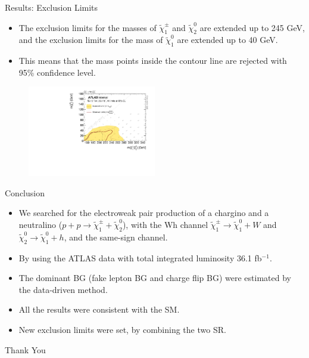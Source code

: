 \documentclass[mathserif,serif]{beamer}
\begin{document}
\begin{frame}{Results: Exclusion Limits}
\begin{itemize}
\item The exclusion limits for the masses of $\tilde{\chi}_1^\pm$ and $\tilde{\chi}_2^0$ are extended up to 245 GeV, and the exclusion limits for the mass of $\tilde{\chi}_1^0$ are extended up to 40 GeV.
\item This means that the mass points inside the contour line are rejected with 95\% confidence level.
\end{itemize}
\begin{figure}
\centering
\includegraphics[width=0.5\textwidth]{data/plot/HistFitterResults/contourPlotterWhSS_upperLimit.pdf}
\end{figure}
\end{frame}

\begin{frame}{Conclusion}
\begin{itemize}
\item We searched for the electroweak pair production of a chargino and a neutralino
($p + p \rightarrow \tilde{\chi}_1^\pm + \tilde{\chi}_2^0$), with the Wh channel $\tilde{\chi}_1^\pm \rightarrow \tilde{\chi}_1^0 + W$ and $\tilde{\chi}_2^0 \rightarrow \tilde{\chi}_1^0 + h$, and the same-sign channel.
\item By using the ATLAS data with total integrated luminosity 36.1 fb$^{-1}$.
\item The dominant BG (fake lepton BG and charge flip BG) were estimated by the data-driven method.
\item All the results were consistent with the SM.
\item New exclusion limits were set, by combining the two SR.
\end{itemize}
\end{frame}

\begin{frame}
\begin{center}
\huge
Thank You
\end{center}
\end{frame}
\end{document}

